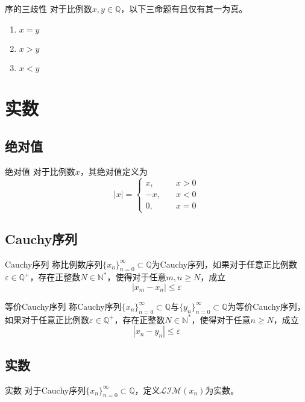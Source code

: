 \documentclass[lang = cn, scheme = chinese, thmcnt = section]{elegantbook}
\newcommand{\N}{\mathbb{N}}            %
\newcommand{\Q}{\mathbb{Q}}            %
\newcommand{\sub}{\subset}             %
\begin{document}
\begin{theorem}{序的三歧性}
	对于比例数$x,y\in\Q$，以下三命题有且仅有其一为真。
	\begin{enumerate}
		\item $x=y$
		\item $x>y$
		\item $x<y$
	\end{enumerate}
\end{theorem}

\section{实数}

\subsection{绝对值}

\begin{definition}{绝对值}
	对于比例数$x$，其绝对值定义为
	$$
	|x|=\begin{cases}
		x,&\quad x>0\\
		-x,&\quad x<0\\
		0,&\quad x=0
	\end{cases}
	$$
\end{definition}

\subsection{Cauchy序列}

\begin{definition}{Cauchy序列}
	称比例数序列$\{x_n\}_{n=0}^{\infty}\sub\Q$为Cauchy序列，如果对于任意正比例数$\varepsilon\in\Q^+$，存在正整数$N\in\N^*$，使得对于任意$m,n\ge N$，成立
	$$
	|x_m-x_n| \le \varepsilon
	$$
\end{definition}

\begin{definition}{等价Cauchy序列}
	称Cauchy序列$\{x_n\}_{n=0}^{\infty}\sub\Q$与$\{y_n\}_{n=0}^{\infty}\sub\Q$为等价Cauchy序列，如果对于任意正比例数$\varepsilon\in\Q^+$，存在正整数$N\in\N^*$，使得对于任意$n\ge N$，成立
	$$
	|x_n-y_n| \le \varepsilon
	$$
\end{definition}

\subsection{实数}

\begin{definition}{实数}
	对于Cauchy序列$\{x_n\}_{n=0}^{\infty}\sub\Q$，定义$\mathcal{LIM}{(x_n)}$为实数。
\end{definition}
\end{document}

